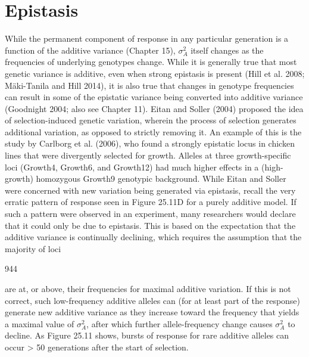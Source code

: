 \documentclass{article}
\begin{document}
\section{Epistasis}
While the permanent component of response in any particular generation is a function of the additive variance (Chapter 15),  $ \sigma_{A}^{2} $ itself changes as the frequencies of underlying genotypes change. While it is generally true that most genetic variance is additive, even when strong epistasis is present (Hill et al. 2008; Mäki-Tanila and Hill 2014), it is also true that changes in genotype frequencies can result in some of the epistatic variance being converted into additive variance (Goodnight 2004; also see Chapter 11). Eitan and Soller (2004) proposed the idea of selection-induced genetic variation, wherein the process of selection generates additional variation, as opposed to strictly removing it. An example of this is the study by Carlborg et al. (2006), who found a strongly epistatic locus in chicken lines that were divergently selected for growth. Alleles at three growth-specific loci (Growth4, Growth6, and Growth12) had much higher effects in a (high-growth) homozygous Growth9 genotypic background. While Eitan and Soller were concerned with new variation being generated via epistasis, recall the very erratic pattern of response seen in Figure 25.11D for a purely additive model. If such a pattern were observed in an experiment, many researchers would declare that it could only be due to epistasis. This is based on the expectation that the additive variance is continually declining, which requires the assumption that the majority of loci

944

are at, or above, their frequencies for maximal additive variation. If this is not correct, such low-frequency additive alleles can (for at least part of the response) generate new additive variance as they increase toward the frequency that yields a maximal value of  $ \sigma_A^2 $, after which further allele-frequency change causes  $ \sigma_A^2 $ to decline. As Figure 25.11 shows, bursts of response for rare additive alleles can occur > 50 generations after the start of selection.
\end{document}
